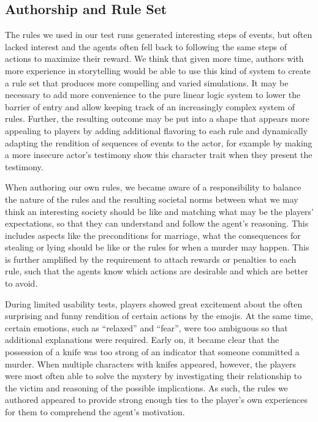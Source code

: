 \subsection{Authorship and Rule Set}
The rules we used in our test runs generated interesting steps of events, but often lacked interest and the agents often fell back to following the same steps of actions to maximize their reward.
We think that given more time, authors with more experience in storytelling would be able to use this kind of system to create a rule set that produces more compelling and varied simulations.
It may be necessary to add more convenience to the pure linear logic system to lower the barrier of entry and allow keeping track of an increasingly complex system of rules.
Further, the resulting outcome may be put into a shape that appears more appealing to players by adding additional flavoring to each rule and dynamically adapting the rendition of sequences of events to the actor, for example by making a more insecure actor's testimony show this character trait when they present the testimony.

When authoring our own rules, we became aware of a responsibility to balance the nature of the rules and the resulting societal norms between what we may think an interesting society should be like and matching what may be the players' expectations, so that they can understand and follow the agent's reasoning.
This includes aspects like the preconditions for marriage, what the consequences for stealing or lying should be like or the rules for when a murder may happen.
This is further amplified by the requirement to attach rewards or penalties to each rule, such that the agents know which actions are desirable and which are better to avoid.

During limited usability tests, players showed great excitement about the often surprising and funny rendition of certain actions by the emojis.
At the same time, certain emotions, such as \enquote{relaxed} and \enquote{fear}, were too ambiguous so that additional explanations were required.
Early on, it became clear that the possession of a knife was too strong of an indicator that someone committed a murder.
When multiple characters with knifes appeared, however, the players were most often able to solve the mystery by investigating their relationship to the victim and reasoning of the possible implications.
As such, the rules we authored appeared to provide strong enough ties to the player's own experiences for them to comprehend the agent's motivation.

